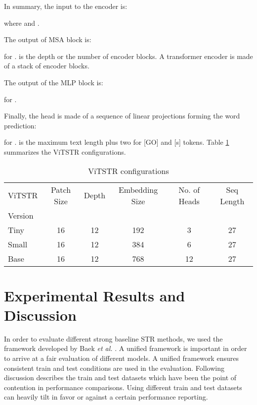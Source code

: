 \documentclass[runningheads]{llncs}
\begin{document}
In summary, the input to the encoder is:



where  and .

The output of MSA block is:




for .  is the depth or the number of encoder blocks. A transformer encoder is made of a stack of  encoder blocks. 

The output of the MLP block is:




for .

Finally, the head is made of a sequence of linear projections forming the word prediction:







for .  is the maximum text length plus two for [GO] and [s] tokens. Table \ref{tab:vitstr_config} summarizes the ViTSTR configurations.


\begin{table}
\caption{ViTSTR configurations}
\label{tab:vitstr_config}

\begin{center}
\begin{tabular}{|l | c | c | c | c | c|}

\hline

ViTSTR  & Patch Size & Depth & Embedding Size  & No. of Heads &  Seq Length\\
Version  &  &  &   &  &  \\
\hline
Tiny & 16 & 12 & 192 & 3 & 27  \\
\hline
Small & 16 & 12 & 384 & 6 & 27  \\
\hline
Base & 16 & 12 & 768 & 12 & 27  \\
\hline

\end{tabular}
\end{center}
\end{table}



\section{Experimental Results and Discussion}

In order to evaluate different strong baseline STR methods, we used the framework developed by Baek \textit{et al.} \cite{baek2019wrong}. A unified framework is important in order to arrive at a fair evaluation of different models. A unified framework ensures consistent train and test conditions are used in the evaluation. Following discussion describes the train and test datasets which have been the point of contention in performance comparisons. Using different train and test datasets can heavily tilt in favor or against a certain performance reporting.
\end{document}

